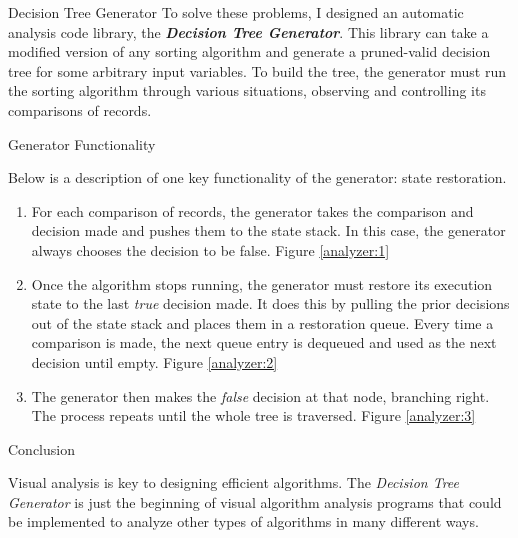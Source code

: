 \documentclass[final]{beamer}
\newlength{\onecolwid}
\begin{document}
\begin{frame}[t]
\begin{columns}[t]
\begin{column}{\onecolwid}
\begin{block}{Decision Tree Generator}
To solve these problems, I designed an automatic analysis code library, the \textit{\textbf{Decision
Tree Generator}}. This library can take a modified version of any sorting algorithm and generate a
pruned-valid decision tree for some arbitrary input variables. To build the tree, the generator must
run the sorting algorithm through various situations, observing and controlling its comparisons of
records.

\end{block}


\begin{block}{Generator Functionality}

Below is a description of one key functionality of the generator: state restoration.

\begin{enumerate}
\item For each comparison of records, the generator takes the comparison and decision made and
	pushes them to the state stack. In this case, the generator always chooses the decision to be
	false. Figure \ref{analyzer:1}
\item Once the algorithm stops running, the generator must restore its execution state to the last
	\textit{true} decision made. It does this by pulling the prior decisions out of the state stack
	and places them in a restoration queue. Every time a comparison is made, the next queue entry is
	dequeued and used as the next decision until empty. Figure \ref{analyzer:2}
\item The generator then makes the \textit{false} decision at that node, branching right. The
	process repeats until the whole tree is traversed. Figure \ref{analyzer:3}
\end{enumerate}

\end{block}



\begin{block}{Conclusion}

Visual analysis is key to designing efficient algorithms. The \textit{Decision Tree Generator} is
just the beginning of visual algorithm analysis programs that could be implemented to analyze other
types of algorithms in many different ways.


\end{block}
\end{column}
\end{columns}
\end{frame}
\end{document}
